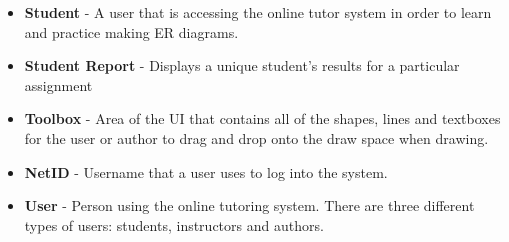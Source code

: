 \begin{itemize}
\item \textbf{Student} - A user that is accessing the online tutor system in order to learn and practice making ER diagrams.
\item \textbf{Student Report} - Displays a unique student's results for a particular assignment
\item \textbf{Toolbox} - Area of the UI that contains all of the shapes, lines and textboxes for the user or author to drag and drop onto the draw space when drawing.
\item \textbf{NetID} - Username that a user uses to log into the system.
\item \textbf{User} - Person using the online tutoring system. There are three different types of users: students, instructors and authors.
\end{itemize}